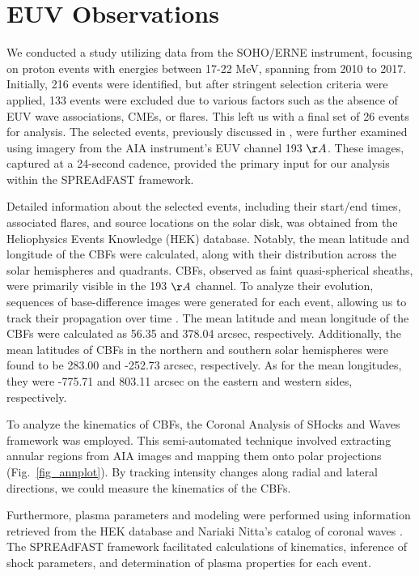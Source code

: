 \section{EUV Observations}
We conducted a study utilizing data from the SOHO/ERNE instrument, focusing on proton events with energies between 17-22 MeV, spanning from 2010 to 2017. Initially, 216 events were identified, but after stringent selection criteria were applied, 133 events were excluded due to various factors such as the absence of EUV wave associations, CMEs, or flares. This left us with a final set of 26 events for analysis.
The selected events, previously discussed in \citep{kozarev_2022}, were further examined using imagery from the AIA instrument's EUV channel 193 $\AA$. These images, captured at a 24-second cadence, provided the primary input for our analysis within the SPREAdFAST framework.

Detailed information about the selected events, including their start/end times, associated flares, and source locations on the solar disk, was obtained from the Heliophysics Events Knowledge (HEK) database. Notably, the mean latitude and longitude of the CBFs were calculated, along with their distribution across the solar hemispheres and quadrants.
CBFs, observed as faint quasi-spherical sheaths, were primarily visible in the 193 $\AA$ channel. To analyze their evolution, sequences of base-difference images were generated for each event, allowing us to track their propagation over time \citep{vourlidas_2003, ontiveros_2009, kozarev_2011, ma_2011}.
The mean latitude and mean longitude of the CBFs were calculated as 56.35 and 378.04 arcsec, respectively. Additionally, the mean latitudes of CBFs in the northern and southern solar hemispheres were found to be 283.00 and -252.73 arcsec, respectively. As for the mean longitudes, they were -775.71 and 803.11 arcsec on the eastern and western sides, respectively.

To analyze the kinematics of CBFs, the Coronal Analysis of SHocks and Waves framework \citep[CASHeW]{kozarev_2017} was employed. This semi-automated technique involved extracting annular regions from AIA images and mapping them onto polar projections (Fig.~\ref{fig_annplot}). By tracking intensity changes along radial and lateral directions, we could measure the kinematics of the CBFs.

Furthermore, plasma parameters and modeling were performed using information retrieved from the HEK database and Nariaki Nitta's catalog of coronal waves \citep{nitta_2013}. The SPREAdFAST framework facilitated calculations of kinematics, inference of shock parameters, and determination of plasma properties for each event.

